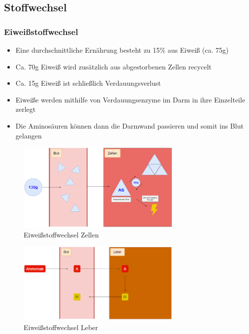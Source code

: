 \documentclass[xcolor=dvipsnames]{beamer}
\begin{document}
    \subsection{Stoffwechsel}
    \begin{frame}[allowframebreaks]
        \frametitle{Eiweißstoffwechsel}

        \begin{itemize}
            \setlength\itemsep{1em}
            \item Eine durchschnittliche Ernährung besteht zu 15\% aus Eiweiß (ca. 75g)
            \item Ca. 70g Eiweiß wird zusätzlich aus abgestorbenen Zellen recycelt
            \item Ca. 15g Eiweiß ist schließlich Verdauungsverlust
            \item Eiweiße werden mithilfe von Verdauungsenzyme im Darm in ihre Einzelteile zerlegt
            \item Die Aminosäuren können dann die Darmwand passieren und somit ins Blut gelangen
        \end{itemize}

        \framebreak

        \begin{figure}
            \centering
            \includegraphics[width=8cm]{../images/as_stoffwechsel.png}
            \caption{Eiweißstoffwechsel Zellen}
        \end{figure}

        \framebreak

        \begin{figure}
            \centering
            \includegraphics[width=8cm]{../images/as_stoffwechsel1.png}
            \caption{Eiweißstoffwechsel Leber}
        \end{figure}

    \end{frame}
\end{document}
